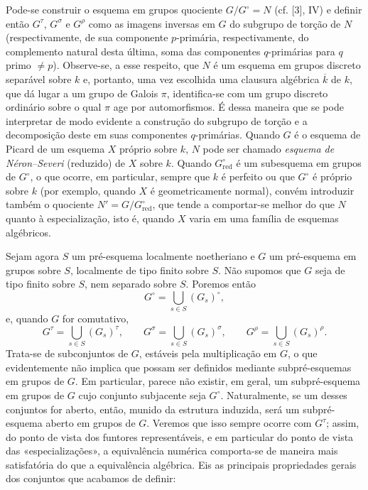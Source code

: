  Pode-se construir o esquema em grupos quociente
$G/G^\circ=N$ (cf. [3], IV) e definir então $G^\tau$, $G^\sigma$ e
$G^\rho$ como as imagens inversas em $G$ do subgrupo de torção de $N$
(respectivamente, de sua componente $p$-primária, respectivamente, do
complemento natural desta última, soma das componentes $q$-primárias para
$q$ primo $\neq p$).
Observe-se, a esse respeito, que $N$ é um esquema em grupos discreto separável
sobre $k$ e, portanto, uma vez escolhida uma clausura algébrica $\overline k$
de $k$, que dá lugar a um grupo de Galois $\pi$, identifica-se com um grupo
discreto ordinário sobre o qual $\pi$ age por automorfismos. É dessa maneira
que se pode interpretar de modo evidente a construção do subgrupo de torção e
a decomposição deste em suas componentes $q$-primárias. Quando $G$ é o esquema
de Picard de um esquema $X$ próprio sobre $k$, $N$ pode ser chamado
\emph{esquema de Néron--Severi} (reduzido) de $X$ sobre $k$. Quando
$G^\circ_{\mathrm{red}}$ é um subesquema em grupos de $G^\circ$, o que
ocorre, em particular, sempre que $k$ é perfeito ou que $G^\circ$ é próprio
sobre $k$ (por exemplo, quando $X$ é geometricamente normal), convém introduzir
também o quociente $N'=G/G^\circ_{\mathrm{red}}$, que tende a comportar-se
melhor do que $N$ quanto à especialização, isto é, quando $X$ varia em uma
família de esquemas algébricos.

Sejam agora $S$ um pré-esquema localmente noetheriano e $G$ um pré-esquema em
grupos sobre $S$, localmente de tipo finito sobre $S$. Não supomos que $G$ seja
de tipo finito sobre $S$, nem separado sobre $S$. Poremos então
\[
G^\circ=\bigcup_{s\in S}(G_s)^\circ,
\]
e, quando $G$ for comutativo,
\[
G^\tau=\bigcup_{s\in S}(G_s)^\tau,
\qquad
G^\sigma=\bigcup_{s\in S}(G_s)^\sigma,
\qquad
G^\rho=\bigcup_{s\in S}(G_s)^\rho.
\]
Trata-se de subconjuntos de $G$, estáveis pela multiplicação em $G$, o que
evidentemente não implica que possam ser definidos mediante subpré-esquemas em
grupos de $G$. Em particular, parece não existir, em geral, um subpré-esquema
em grupos de $G$ cujo conjunto subjacente seja $G^\circ$. Naturalmente, se um
desses conjuntos for aberto, então, munido da estrutura induzida, será um
subpré-esquema aberto em grupos de $G$. Veremos que isso sempre ocorre com
$G^\tau$; assim, do ponto de vista dos funtores representáveis, e em particular
do ponto de vista das «especializações», a equivalência numérica comporta-se
de maneira mais satisfatória do que a equivalência algébrica. Eis as principais
propriedades gerais dos conjuntos que acabamos de definir:

